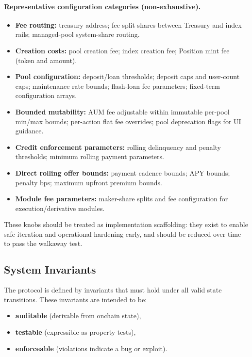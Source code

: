 \documentclass[version=preprint]{iacrcc}
\begin{document}
\paragraph{Representative configuration categories (non-exhaustive).}
\begin{itemize}
  \item \textbf{Fee routing:} treasury address; fee split shares between Treasury and index rails; managed-pool system-share routing.
  \item \textbf{Creation costs:} pool creation fee; index creation fee; Position mint fee (token and amount).
  \item \textbf{Pool configuration:} deposit/loan thresholds; deposit caps and user-count caps; maintenance rate bounds; flash-loan fee parameters; fixed-term configuration arrays.
  \item \textbf{Bounded mutability:} AUM fee adjustable within immutable per-pool min/max bounds; per-action flat fee overrides; pool deprecation flags for UI guidance.
  \item \textbf{Credit enforcement parameters:} rolling delinquency and penalty thresholds; minimum rolling payment parameters.
  \item \textbf{Direct rolling offer bounds:} payment cadence bounds; APY bounds; penalty bps; maximum upfront premium bounds.
  \item \textbf{Module fee parameters:} maker-share splits and fee configuration for execution/derivative modules.
\end{itemize}
These knobs should be treated as implementation scaffolding: they exist to enable safe iteration and operational hardening early, and should be reduced over time to pass the walkaway test.

\subsection{System Invariants}

The protocol is defined by invariants that must hold under all valid state transitions. These invariants are intended to be:
\begin{itemize}
  \item \textbf{auditable} (derivable from onchain state),
  \item \textbf{testable} (expressible as property tests),
  \item \textbf{enforceable} (violations indicate a bug or exploit).
\end{itemize}
\end{document}
